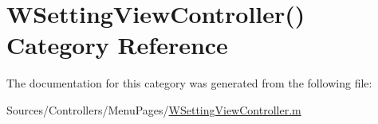 \hypertarget{category_w_setting_view_controller_07_08}{\section{W\-Setting\-View\-Controller() Category Reference}
\label{category_w_setting_view_controller_07_08}
}


The documentation for this category was generated from the following file\-:\begin{DoxyCompactItemize}
\item 
Sources/\-Controllers/\-Menu\-Pages/\hyperlink{_w_setting_view_controller_8m}{W\-Setting\-View\-Controller.\-m}\end{DoxyCompactItemize}
